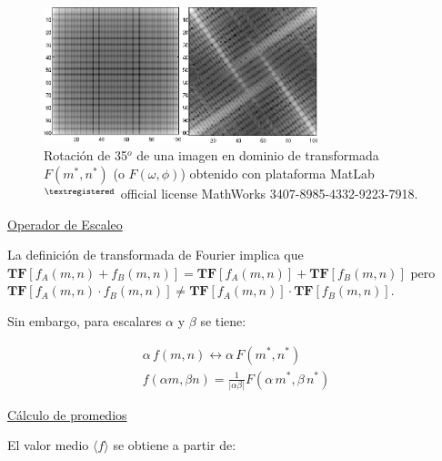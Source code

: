 
\begin{center}
\begin{figure} [h!]

\centering
\includegraphics[width=8cm]{Figuras/Fig2_7.png}
   
\caption{Rotaci\'on de 35$^{o}$ de una imagen en dominio de transformada $F(m^*, n^*)$ (o $F(\omega, \phi)$)
         obtenido con plataforma MatLab$^{\textregistered}$ official license MathWorks 3407-8985-4332-9223-7918.}
\label{Fig2_7}

\end{figure}
\end{center}



\underline{Operador de Escaleo}

\vspace{0.5cm}

La definici\'on de transformada de Fourier implica que $\mathbf{TF} [f_{A}(m, n) + f_{B}(m, n)] = 
\mathbf{TF} [f_{A}(m, n)] + \mathbf{TF}[f_{B}(m, n)]$ pero $\mathbf{TF} [f_{A}(m, n) \cdot f_{B}(m, n)] \neq 
\mathbf{TF} [f_{A}(m, n)] \cdot \mathbf{TF}[f_{B}(m, n)]$.
%

%
Sin embargo, para escalares $\alpha$ y $\beta$ se tiene:

\begin{eqnarray}
	\alpha \, f(m, n) \leftrightarrow \alpha \, F(m^*, n^*) \\
	f(\alpha m, \beta n) = \frac{1}{\lvert \alpha \beta \rvert} 
	F(\alpha \, m^*, \beta \, n^*)
\label{EqLXII}
\end{eqnarray}


\vspace{1.0cm}

\underline{C\'alculo de promedios}

\vspace{0.5cm}

El valor medio $\langle f \rangle$ se obtiene a partir de:


